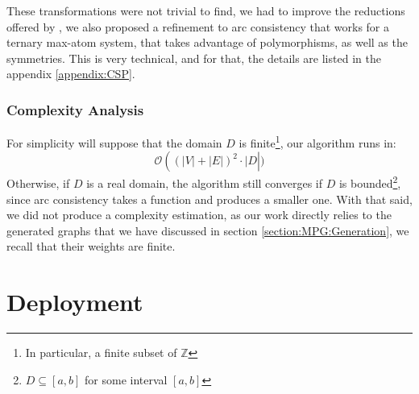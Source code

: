 These transformations were not trivial to find, we had to improve the reductions offered by \cite{MPGMaxAtom}, we also proposed a refinement to arc consistency that works for a ternary max-atom system, that takes advantage of polymorphisms, as well as the symmetries.
\newline This is very technical, and for that, the details are listed in the appendix \ref{appendix:CSP}.
\subsubsection{Complexity Analysis}
For simplicity will suppose that the domain $D$ is finite\footnote{In particular, a finite subset of $\mathbb{Z}$}, our algorithm runs in:
\begin{equation*}
	\mathcal{O}\left((\lvert V\rvert +\lvert E\rvert)^2 \cdot \lvert D\right\rvert)
\end{equation*}
Otherwise, if $D$ is a real domain, the algorithm still converges if $D$ is bounded\footnote{$D\subseteq [a,b]$ for some interval $[a,b]$}, since arc consistency takes a function and produces a smaller one. With that said, we did not produce a complexity estimation, as our work directly relies to the generated graphs that we have discussed in section \ref{section:MPG:Generation}, we recall that their weights are finite.


\section{Deployment}
